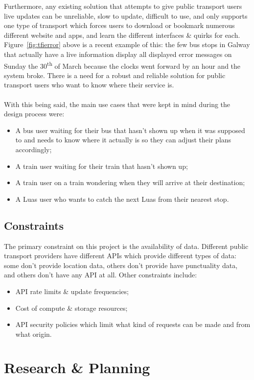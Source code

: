 \documentclass[a4paper,11pt]{report}
\begin{document}
Furthermore, any existing solution that attempts to give public transport users live updates can be unreliable, slow to update, difficult to use, and only supports one type of transport which forces users to download or bookmark numerous different website and apps, and learn the different interfaces \& quirks for each.
Figure~\ref{fig:tfierror} above is a recent example of this: the few bus stops in Galway that actually have a live information display all displayed error messages on Sunday the 30\textsuperscript{th} of March because the clocks went forward by an hour and the system broke.
There is a need for a robust and reliable solution for public transport users who want to know where their service is.
\\\\
With this being said, the main use cases that were kept in mind during the design process were:
\begin{itemize}
    \item   A bus user waiting for their bus that hasn't shown up when it was supposed to and needs to know where it actually is so they can adjust their plans accordingly;
    \item   A train user waiting for their train that hasn't shown up;
    \item   A train user on a train wondering when they will arrive at their destination;
    \item   A Luas user who wants to catch the next Luas from their nearest stop.
\end{itemize}

\section{Constraints}
The primary constraint on this project is the availability of data.
Different public transport providers have different APIs which provide different types of data:
some don't provide location data, others don't provide have punctuality data, and others don't have any API at all.
Other constraints include:
\begin{itemize}
    \item   API rate limits \& update frequencies;
    \item   Cost of compute \& storage resources;
    \item   API security policies which limit what kind of requests can be made and from what origin.
\end{itemize}

\chapter{Research \& Planning}
\end{document}
